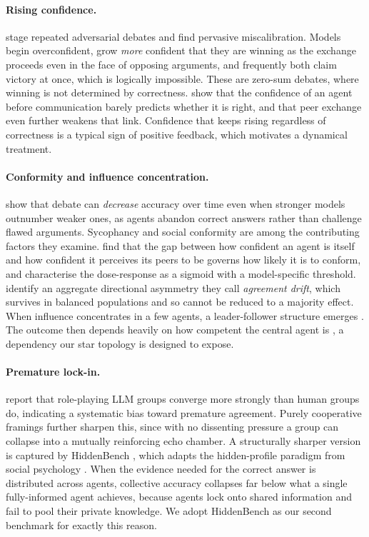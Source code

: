 \paragraph{Rising confidence.}
\citet{prasad2025certain} stage repeated adversarial debates and find pervasive
miscalibration. Models begin overconfident, grow \emph{more} confident that they
are winning as the exchange proceeds even in the face of opposing arguments, and
frequently both claim victory at once, which is logically impossible. 
These are zero-sum debates, where winning is not determined by correctness.
\citet{bertalanic2026costofconsensus} show that the confidence of an agent before
communication barely predicts whether it is right, and that peer exchange even
further weakens that link. Confidence that keeps rising regardless of correctness
is a typical sign of positive feedback, which motivates a dynamical treatment.

\paragraph{Conformity and influence concentration.}
\citet{wynn2025talk} show that debate can \emph{decrease} accuracy over time
even when stronger models outnumber weaker ones, as agents abandon correct
answers rather than challenge flawed arguments. Sycophancy
\citep{sharma2023sycophancy} and social conformity are among the contributing
factors they examine. \citet{cho2025herd} find that the gap
between how confident an agent is itself and how confident it perceives its peers to be governs
how likely it is to conform, and \citet{mehdizadeh2025peerpressure} characterise
the dose-response as a sigmoid with a model-specific threshold.
\citet{cau2026agreementdrift} identify an aggregate directional asymmetry they
call \emph{agreement drift}, which survives in balanced populations and so cannot
be reduced to a majority effect. When influence concentrates in a few agents, a
leader-follower structure emerges \citep{chen2023consensus}. The outcome then
depends heavily on how competent the central agent is
\citep{conformitydynamics2026}, a dependency our star topology is designed to
expose.

\paragraph{Premature lock-in.}
\citet{chuang2025debate} report that role-playing \ac{LLM} groups converge more
strongly than human groups do, indicating a systematic bias toward
premature agreement. Purely cooperative framings further sharpen this, since with no dissenting
pressure a group can collapse into a mutually reinforcing echo chamber. A
structurally sharper version is captured by HiddenBench
\citep{li2026hiddenbench}, which adapts the hidden-profile paradigm from social
psychology \citep{stasser1985pooling, schulzhardt2012synergy}. When the evidence
needed for the correct answer is distributed across agents, collective accuracy
collapses far below what a single fully-informed agent achieves, because agents
lock onto shared information and fail to pool their private knowledge. We adopt
HiddenBench as our second benchmark for exactly this reason.


